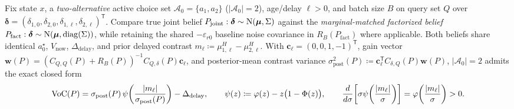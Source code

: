 Fix state $x$, a \emph{two-alternative} active choice set $\mathcal{A}_0 = \{a_1, a_2\}$ ($|\mathcal{A}_0|=2$), age/delay $\ell > 0$, and batch size $B$ on query set $Q$ over $\boldsymbol\delta = (\delta_{1,0}, \delta_{2,0}, \delta_{1,\ell}, \delta_{2,\ell})^{\mathsf T}$. Compare true joint belief $P_{\mathrm{joint}}: \boldsymbol\delta \sim \mathrm{N}(\boldsymbol\mu, \Sigma)$ against the \emph{marginal-matched factorized belief} $P_{\mathrm{fact}}: \boldsymbol\delta \sim \mathrm{N}(\boldsymbol\mu, \operatorname{diag}(\Sigma))$, while retaining the shared $-\varepsilon_{r0}$ baseline noise covariance in $R_B(P_{\mathrm{fact}})$ where applicable. Both beliefs share identical $a^\star_0$, $V_{\mathrm{now}}$, $\Delta_{\mathrm{delay}}$, and prior delayed contrast $m_\ell \coloneqq \mu^H_{1,\ell} - \mu^H_{2,\ell}$. With $\mathbf{c}_\ell = (0,0,1,-1)^{\mathsf T}$, gain vector $\mathbf{w}(P) = (C_{Q,Q}(P) + R_B(P))^{-1} C_{Q,\delta}(P)\mathbf{c}_\ell$, and posterior-mean contrast variance $\sigma_{\mathrm{post}}^2(P) \coloneqq \mathbf{c}_\ell^{\mathsf T} C_{\delta,Q}(P)\mathbf{w}(P)$, $|\mathcal{A}_0|=2$ admits the exact closed form \citep{frazier2009knowledge}
\begin{equation}\label{eq:closed-voc}
\operatorname{VoC}(P) = \sigma_{\mathrm{post}}(P)\,\psi\!\left(\frac{|m_\ell|}{\sigma_{\mathrm{post}}(P)}\right) - \Delta_{\mathrm{delay}},
\qquad
\psi(z) \coloneqq \varphi(z) - z\big(1 - \Phi(z)\big),
\qquad
\frac{d}{d\sigma}\!\left[\sigma\psi\!\left(\frac{|m_\ell|}{\sigma}\right)\right] = \varphi\!\left(\frac{|m_\ell|}{\sigma}\right) > 0.
\end{equation}

